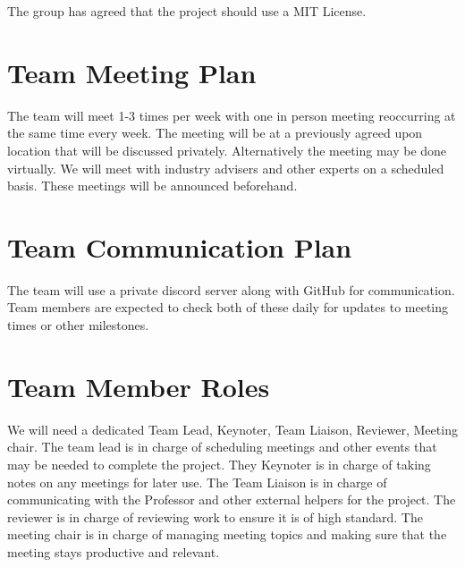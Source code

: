\documentclass{article}
\begin{document}
The group has agreed that the project should use a MIT License.


\section{Team Meeting Plan}


The team will meet 1-3 times per week with one in person meeting reoccurring at the same time every week. The meeting will be at a previously agreed upon location that will be discussed privately. Alternatively the meeting may be done virtually. We will meet with industry advisers and  other experts on a scheduled basis. These meetings will be announced beforehand. 








\section{Team Communication Plan}


The team will use a private discord server along with GitHub for communication. Team members are expected to check both of these daily for updates to meeting times or other milestones.  

\section{Team Member Roles}

We will need a dedicated Team Lead, Keynoter, Team Liaison, Reviewer, Meeting chair.
The team lead is in charge of scheduling meetings and other events that may be needed to complete the project. They Keynoter is in charge of taking notes on any meetings for later use. The Team Liaison is in charge of communicating with the Professor and other external helpers for the project. The reviewer is in charge of reviewing work to ensure it is of high standard. The meeting chair is in charge of managing meeting topics and making sure that the meeting stays productive and relevant. 
\end{document}
